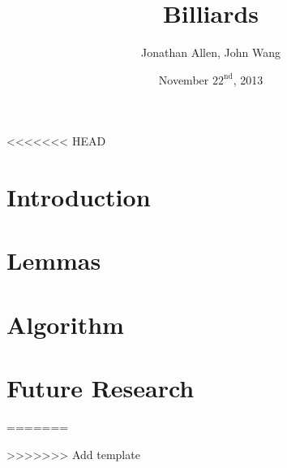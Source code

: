 \documentclass{beamer}
\title{Billiards}
\author{Jonathan Allen, John Wang}
\institute[MIT]{Massachusetts Institute of Technology}
\date{November $22^\text{nd}$, 2013}
\begin{document}
\graphicspath{ {figures/} }

\frame{

\titlepage

}

<<<<<<< HEAD
\section{Introduction}



\section{Lemmas}



\section{Algorithm}



\section{Future Research}

=======






>>>>>>> Add template

\end{document}
